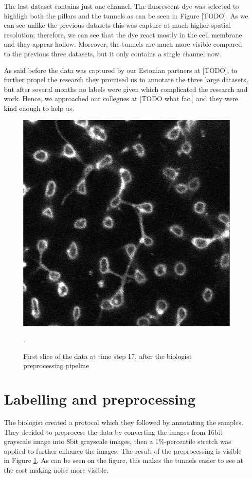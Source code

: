 \documentclass[
  digital,     %
  oneside,     %
  nosansbold,  %
  nocolorbold, %
  lof,         %
  lot,         %
]{fithesis4}
\begin{document}
The last dataset contains just one channel. The fluorescent dye was selected to
highligh both the pillars and the tunnels as can be seen in Figure [TODO]. As we
can see unlike the previous datasets this was capture at much higher spatial
resolution; therefore, we can see that the dye react mostly in the cell membrane
and they appear hollow. Moreover, the tunnels are much more visible compared to
the previous three datasets, but it only contains a single channel now.

As said before the data was captured by our Estonian partners at [TODO], to
further propel the research they promised us to annotate the three large
datasets, but after several months no labels were given which complicated the
research and work. Hence, we approached our collegues at [TODO what fac.] and
they were kind enough to help us.

\begin{figure}
    \begin{center}
        \includegraphics[width=0.6\linewidth]{resources/t017z0_saturated1percent.png}
    \end{center}
    \caption{First slice of the data at time step 17, after the biologist
    preprocessing pipeline}.
    \label{fig:biologistpreprocessing}
\end{figure}

\section{Labelling and preprocessing}

The biologist created a protocol which they followed by annotating the samples.
They decided to preprocess the data by converting the images from 16bit
grayscale image into 8bit grayscale images, then a 1\%-percentile stretch was
applied to further enhance the images. The result of the preprocessing is
visible in Figure \ref{fig:biologistpreprocessing}. As can be seen on the figure,
this makes the tunnels easier to see at the cost making noise more visible.
\end{document}
